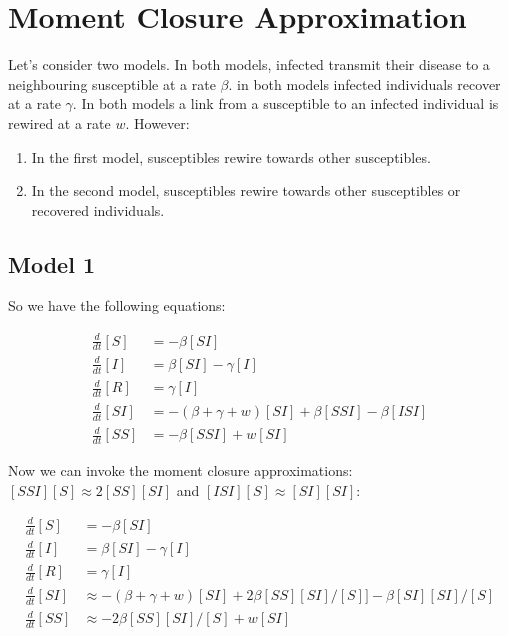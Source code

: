 \documentclass[a4paper,10pt]{article}
\title{}
\author{}
\begin{document}
\maketitle

\begin{abstract}

\end{abstract}

\section{Moment Closure Approximation}

Let's consider two models. In both models, infected transmit their disease to a neighbouring susceptible at a rate $\beta$. in both models infected individuals recover at a rate $\gamma$. In both models a link from a susceptible to an infected individual is rewired at a rate $w$. 
However:
\begin{enumerate}
 \item In the first model, susceptibles rewire towards other susceptibles.
 \item In the second model, susceptibles rewire towards other susceptibles or recovered individuals.
\end{enumerate}

\subsection{Model 1}

So we have the following equations:

\begin{align}
 \frac{d}{dt} [S]
 &=
 -\beta [SI]
 \\
 \frac{d}{dt} [I]
 &=
 \beta [SI] - \gamma [I]
 \\
 \frac{d}{dt} [R]
 &=
\gamma [I]
 \\
 \frac{d}{dt} [SI]
 &=
 -(\beta+\gamma+w)[SI] + \beta[SSI] -\beta[ISI] 
 \\
 \frac{d}{dt} [SS]
 &=
- \beta [SSI] + w [SI]
 \end{align}
 
 Now we can invoke the moment closure approximations: $[SSI][S]\approx 2[SS][SI]$ and $[ISI][S]\approx [SI][SI]$:
 
 
 \begin{align}
 \frac{d}{dt} [S]
 &=
 -\beta [SI]
 \\
 \frac{d}{dt} [I]
 &=
 \beta [SI] - \gamma [I]
 \\
 \frac{d}{dt} [R]
 &=
\gamma [I]
 \\
 \frac{d}{dt} [SI]
 &\approx
 -(\beta+\gamma+w)[SI] + 2 \beta [SS][SI]/[S]] -\beta [SI][SI]/[S] 
 \\
 \frac{d}{dt} [SS]
 &\approx
- 2 \beta [SS][SI]/[S] + w [SI]
 \end{align}
 
\end{document}
